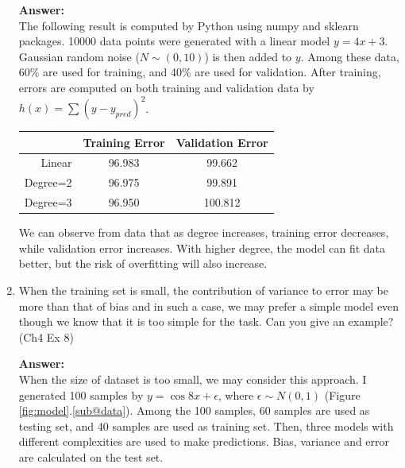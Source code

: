 \documentclass{article}
\begin{document}
\begin{enumerate}
    \textbf{Answer:} \\
    The following result is computed by Python using numpy and sklearn packages. 10000 data points were generated with a linear model $y=4x+3$. Gaussian random noise ($N \sim (0, 10)$) is then added to $y$. Among these data, 60\% are used for training, and 40\% are used for validation. After training, errors are computed on both training and validation data by $h(x)=\sum (y-y_{pred})^2$.  %
    \begin{center}
        \begin{tabular}{rcc}
        \hline
                    & Training Error & Validation Error \\ \hline
        Linear   & 96.983      & 99.662           \\
        Degree=2 & 96.975      & 99.891           \\
        Degree=3 & 96.950      & 100.812          \\ \hline
    \end{tabular}
    \end{center}
    We can observe from data that as degree increases, training error decreases, while validation error increases. With higher degree, the model can fit data better, but the risk of overfitting will also increase.

    \item  When the training set is small, the contribution of variance to error may be more than that of bias and in such a case, we may prefer a simple model even though we know that it is too simple for the task. Can you give an example? (Ch4 Ex 8) %
    
    \textbf{Answer:} \\
    When the size of dataset is too small, we may consider this approach.
    I generated 100 samples by $y=\cos 8x + \epsilon$, where $\epsilon \sim N(0,1)$ (Figure \ref{fig:model}.\ref{sub@data}). Among the 100 samples, 60 samples are used as testing set, and 40 samples are used as training set. Then, three models with different complexities are used to make predictions. Bias, variance and error are calculated on the test set.


\end{enumerate}
\end{document}
